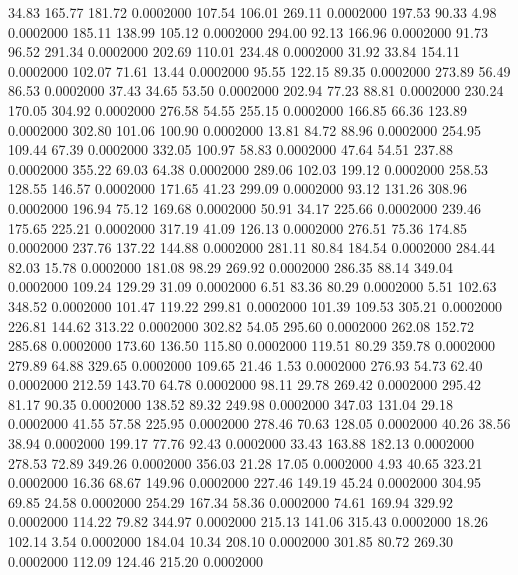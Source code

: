   34.83  165.77  181.72   0.0002000
 107.54  106.01  269.11   0.0002000
 197.53   90.33    4.98   0.0002000
 185.11  138.99  105.12   0.0002000
 294.00   92.13  166.96   0.0002000
  91.73   96.52  291.34   0.0002000
 202.69  110.01  234.48   0.0002000
  31.92   33.84  154.11   0.0002000
 102.07   71.61   13.44   0.0002000
  95.55  122.15   89.35   0.0002000
 273.89   56.49   86.53   0.0002000
  37.43   34.65   53.50   0.0002000
 202.94   77.23   88.81   0.0002000
 230.24  170.05  304.92   0.0002000
 276.58   54.55  255.15   0.0002000
 166.85   66.36  123.89   0.0002000
 302.80  101.06  100.90   0.0002000
  13.81   84.72   88.96   0.0002000
 254.95  109.44   67.39   0.0002000
 332.05  100.97   58.83   0.0002000
  47.64   54.51  237.88   0.0002000
 355.22   69.03   64.38   0.0002000
 289.06  102.03  199.12   0.0002000
 258.53  128.55  146.57   0.0002000
 171.65   41.23  299.09   0.0002000
  93.12  131.26  308.96   0.0002000
 196.94   75.12  169.68   0.0002000
  50.91   34.17  225.66   0.0002000
 239.46  175.65  225.21   0.0002000
 317.19   41.09  126.13   0.0002000
 276.51   75.36  174.85   0.0002000
 237.76  137.22  144.88   0.0002000
 281.11   80.84  184.54   0.0002000
 284.44   82.03   15.78   0.0002000
 181.08   98.29  269.92   0.0002000
 286.35   88.14  349.04   0.0002000
 109.24  129.29   31.09   0.0002000
   6.51   83.36   80.29   0.0002000
   5.51  102.63  348.52   0.0002000
 101.47  119.22  299.81   0.0002000
 101.39  109.53  305.21   0.0002000
 226.81  144.62  313.22   0.0002000
 302.82   54.05  295.60   0.0002000
 262.08  152.72  285.68   0.0002000
 173.60  136.50  115.80   0.0002000
 119.51   80.29  359.78   0.0002000
 279.89   64.88  329.65   0.0002000
 109.65   21.46    1.53   0.0002000
 276.93   54.73   62.40   0.0002000
 212.59  143.70   64.78   0.0002000
  98.11   29.78  269.42   0.0002000
 295.42   81.17   90.35   0.0002000
 138.52   89.32  249.98   0.0002000
 347.03  131.04   29.18   0.0002000
  41.55   57.58  225.95   0.0002000
 278.46   70.63  128.05   0.0002000
  40.26   38.56   38.94   0.0002000
 199.17   77.76   92.43   0.0002000
  33.43  163.88  182.13   0.0002000
 278.53   72.89  349.26   0.0002000
 356.03   21.28   17.05   0.0002000
   4.93   40.65  323.21   0.0002000
  16.36   68.67  149.96   0.0002000
 227.46  149.19   45.24   0.0002000
 304.95   69.85   24.58   0.0002000
 254.29  167.34   58.36   0.0002000
  74.61  169.94  329.92   0.0002000
 114.22   79.82  344.97   0.0002000
 215.13  141.06  315.43   0.0002000
  18.26  102.14    3.54   0.0002000
 184.04   10.34  208.10   0.0002000
 301.85   80.72  269.30   0.0002000
 112.09  124.46  215.20   0.0002000
